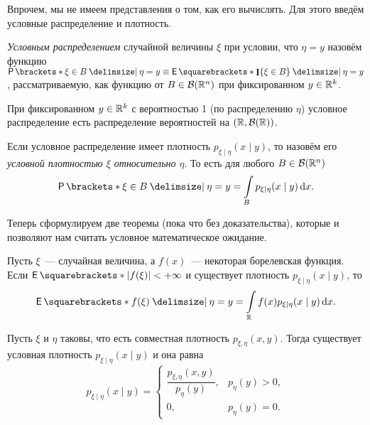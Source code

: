Впрочем, мы не имеем представления о том, как его вычислять. Для этого введём условные распределение и плотность.
\begin{definition}
	\emph{Условным распределением} случайной величины \(\xi\) при условии, что \(\eta = y\) назовём функцию \(\Pr{\xi \in B \given \eta = y} \equiv \E{\I\{\xi \in B\} \given \eta = y}\), рассматриваемую, как функцию от \(B \in \mathcal{B}(\mathbb{R}^n)\) при фиксированном \(y \in \mathbb{R}^k\).
\end{definition}

\begin{point}
	При фиксированном \(y \in \mathbb{R}^k\) с вероятностью 1 (по распределению \(\eta\)) условное распределение есть распределение вероятностей на \((\mathbb{R}, \mathcal{B}(\mathbb{R}))\).
\end{point}

\begin{definition}
	Если условное распределение имеет плотность \(p_{\xi \mid \eta}(x \mid y)\), то назовём его \emph{условной плотностью \(\xi\) относительно \(\eta\)}. То есть для любого \(B \in \mathcal{B}(\mathbb{R}^n)\)
	\[
		\Pr{\xi \in B \given \eta = y} = \int\limits_{B} p_{\xi \mid \eta}(x \mid y)\diff x.
	\]
\end{definition}

Теперь сформулируем две теоремы (пока что без доказательства), которые и позволяют нам считать условное математическое ожидание.
\begin{theorem}
	Пусть \(\xi\)~--- случайная величина, а \(f(x)\)~--- некоторая борелевская функция. Если \(\E{|f(\xi)|} < +\infty\) и существует плотность \(p_{\xi \mid \eta}(x \mid y)\), то
	\[
		\E{f(\xi) \given \eta = y} = \int\limits_{\R} f(x)p_{\xi \mid \eta}(x \mid y)\diff x.
	\]
\end{theorem}
\begin{theorem}
	Пусть \(\xi\) и \(\eta\) таковы, что есть совместная плотность \(p_{\xi, \eta}(x, y)\). Тогда существует условная плотность \(p_{\xi \mid \eta}(x \mid y)\) и она равна
	\[
		p_{\xi \mid \eta}(x \mid y) = \begin{cases}
		\dfrac{p_{\xi, \eta}(x, y)}{p_{\eta}(y)},& p_{\eta}(y) > 0, \\
		0,& p_{\eta}(y) = 0.
		\end{cases}
	\]
\end{theorem}

